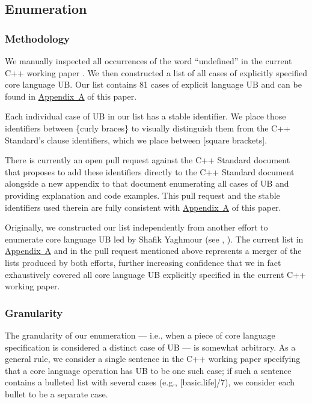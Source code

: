 \subsection{Enumeration}

\subsubsection{Methodology}

We manually inspected all occurrences of the word ``undefined'' in the current C++ working paper \cite{N5008}. We then constructed a list of all cases of explicitly specified core language UB. Our list contains 81 cases of explicit language UB and can be found in \hyperref[appendix]{Appendix~A} of this paper. 

Each individual case of UB in our list has a stable identifier. We place those identifiers between \{curly braces\} to visually distinguish them from the C++ Standard's clause identifiers, which we place between [square brackets]. 

There is currently an open pull request against the C++ Standard document that proposes to add these identifiers directly to the C++ Standard document alongside a new appendix to that document enumerating all cases of UB and providing explanation and code examples. This pull request and the stable identifiers used therein are fully consistent with \hyperref[appendix]{Appendix~A} of this paper. 

Originally, we constructed our list independently from another effort to enumerate core language UB led by Shafik Yaghmour (see \cite{P1705R1}, \cite{P3075R0}). The current list in \hyperref[appendix]{Appendix~A} and in the pull request mentioned above represents a merger of the lists produced by both efforts, further increasing confidence that we in fact exhaustively covered all core language UB explicitly specified in the current C++ working paper.

\subsubsection{Granularity}

The granularity of our enumeration --- i.e., when a piece of core language specification is considered a distinct case of UB --- is somewhat arbitrary. As a general rule, we consider a single sentence in the C++ working paper specifying that a core language operation has UB to be one such case; if such a sentence contains a bulleted list with several cases (e.g., [basic.life]/7), we consider each bullet to be a separate case.

